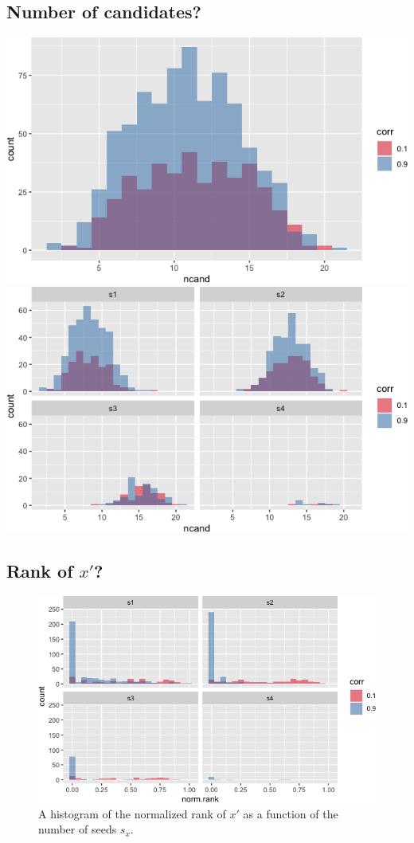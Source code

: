 \documentclass[
]{article}
\begin{document}
\hypertarget{number-of-candidates}{%
\subsection{Number of candidates?}\label{number-of-candidates}}

\includegraphics{vn_files/figure-latex/cand-1.png}
\includegraphics{vn_files/figure-latex/ncand-1.png}

\hypertarget{rank-of-x}{%
\subsection{\texorpdfstring{Rank of
\(x'\)?}{Rank of x'?}}\label{rank-of-x}}

\begin{figure}
\centering
\includegraphics{vn_files/figure-latex/rank-1.png}
\caption{A histogram of the normalized rank of \(x'\) as a function of
the number of seeds \(s_x\).}
\end{figure}
\end{document}
